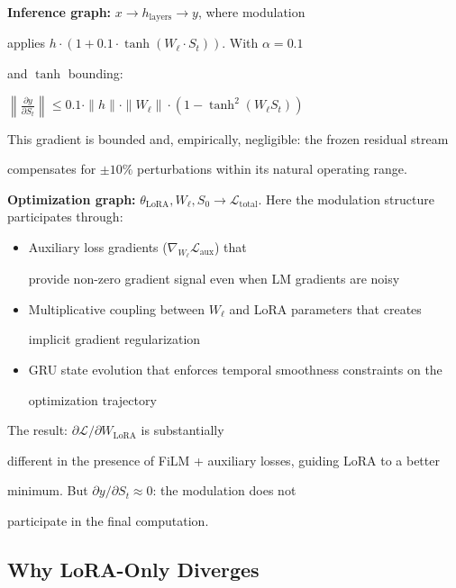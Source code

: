\documentclass[11pt,a4paper]{article}
\begin{document}
\textbf{Inference graph:} $x \to h_{\mathrm{layers}} \to y$, where modulation

applies $h \cdot (1 + 0.1 \cdot \tanh(W_\ell \cdot S_t))$. With $\alpha = 0.1$

and $\tanh$ bounding:

$\left\|\frac{\partial y}{\partial S_t}\right\| \leq 0.1 \cdot \|h\| \cdot \|W_\ell\| \cdot (1 - \tanh^2(W_\ell S_t))$

This gradient is bounded and, empirically, negligible: the frozen residual stream

compensates for $\pm 10\%$ perturbations within its natural operating range.



\textbf{Optimization graph:} $\theta_{\mathrm{LoRA}}, W_\ell, S_0 \to

\mathcal{L}_\mathrm{total}$. Here the modulation structure participates through:

\begin{itemize}

  \item Auxiliary loss gradients ($\nabla_{W_\ell} \mathcal{L}_\mathrm{aux}$) that

    provide non-zero gradient signal even when LM gradients are noisy

  \item Multiplicative coupling between $W_\ell$ and LoRA parameters that creates

    implicit gradient regularization

  \item GRU state evolution that enforces temporal smoothness constraints on the

    optimization trajectory

\end{itemize}



The result: $\partial \mathcal{L} / \partial W_{\mathrm{LoRA}}$ is substantially

different in the presence of FiLM + auxiliary losses, guiding LoRA to a better

minimum. But $\partial y / \partial S_t \approx 0$: the modulation does not

participate in the final computation.



\subsection{Why LoRA-Only Diverges}
\end{document}
